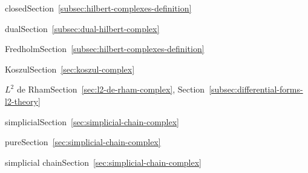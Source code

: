 \par\noindent\hspace*{2em}\label{index:complex-hilbert-closed}{closed}\quad Section~\ref{subsec:hilbert-complexes-definition}

\par\noindent\hspace*{2em}\label{index:complex-hilbert-dual}{dual}\quad Section~\ref{subsec:dual-hilbert-complex}

\par\noindent\hspace*{2em}\label{index:complex-hilbert-fredholm}{Fredholm}\quad Section~\ref{subsec:hilbert-complexes-definition}

\par\noindent\hspace*{1em}\label{index:complex-koszul}{Koszul}\quad Section~\ref{sec:koszul-complex}

\par\noindent\hspace*{1em}\label{index:complex-l-2-de-rham}{$L^2$ de Rham}\quad Section~\ref{sec:l2-de-rham-complex}, Section~\ref{subsec:differential-forms-l2-theory}

\par\noindent\hspace*{1em}\label{index:complex-simplicial}{simplicial}\quad Section~\ref{sec:simplicial-chain-complex}

\par\noindent\hspace*{2em}\label{index:complex-simplicial-pure}{pure}\quad Section~\ref{sec:simplicial-chain-complex}

\par\noindent\hspace*{1em}\label{index:complex-simplicial-chain}{simplicial chain}\quad Section~\ref{sec:simplicial-chain-complex}

